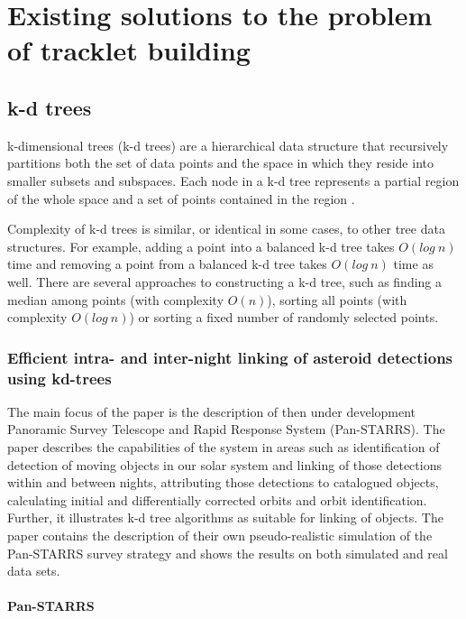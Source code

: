 \chapter{Existing solutions to the problem of tracklet building}\label{chap:existing_solutions}

\section{k-d trees}\label{sec:kd_trees}
	
	k-dimensional trees (k-d trees) are a hierarchical data structure that recursively partitions both the set of data points and the space in which they reside into smaller subsets and subspaces. Each node in a k-d tree represents a partial region of the whole space and a set of points contained in the region \citep{}.
	
	Complexity of k-d trees is similar, or identical in some cases, to other tree data structures. For example, adding a point into a balanced k-d tree takes $O(log\ n)$ time and removing a point from a balanced k-d tree takes $O(log\ n)$ time as well. There are several approaches to constructing a k-d tree, such as finding a median among points (with complexity $O(n)$), sorting all points (with complexity $O(log\ n)$) or sorting a fixed number of randomly selected points.

\subsection{Efficient intra- and inter-night linking of asteroid detections using kd-trees}\label{subsec:intra_inter}

	The main focus of the paper is the description of then under development Panoramic Survey Telescope and Rapid Response System (Pan-STARRS). The paper describes the capabilities of the system in areas such as identification of detection of moving objects in our solar system and linking of those detections within and between nights, attributing those detections to catalogued objects, calculating initial and differentially corrected orbits and orbit identification. Further, it illustrates k-d tree algorithms as suitable for linking of objects. The paper contains the description of their own pseudo-realistic simulation of the Pan-STARRS survey strategy and shows the results on both simulated and real data sets.
	
\subsubsection{Pan-STARRS}
	
